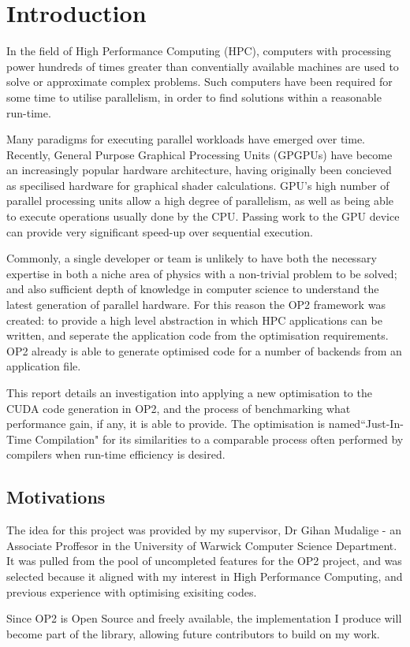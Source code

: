 
\section{Introduction}

In the field of High Performance Computing (HPC), computers with processing power hundreds of times greater than conventially available machines are used to solve or approximate complex problems. Such computers have been required for some time to utilise parallelism, in order to find solutions within a reasonable run-time.
\par Many paradigms for executing parallel workloads have emerged over time. Recently, General Purpose Graphical Processing Units (GPGPUs) have become an increasingly popular hardware architecture, having originally been concieved as specilised hardware for graphical shader calculations. GPU's high number of parallel processing units allow a high degree of parallelism, as well as being able to execute operations usually done by the CPU. Passing work to the GPU device can provide very significant speed-up over sequential execution.
\par
Commonly, a single developer or team is unlikely to have both the necessary expertise in both a niche area of physics with a non-trivial problem to be solved; and also sufficient depth of knowledge in computer science to understand the latest generation of parallel hardware. For this reason the OP2 framework was created: to provide a high level abstraction in which HPC applications can be written, and seperate the application code from the optimisation requirements. OP2 already is able to generate optimised code for a number of backends from an application file.
\par
This report details an investigation into applying a new optimisation to the CUDA code generation in OP2, and the process of benchmarking what performance gain, if any, it is able to provide.
The optimisation is named``Just-In-Time Compilation" for its similarities to a comparable process often performed by compilers when run-time efficiency is desired.
\vfill
\subsection{Motivations}
The idea for this project was provided by my supervisor, Dr Gihan Mudalige - an Associate Proffesor in the University of Warwick Computer Science Department. It was pulled from the pool of uncompleted features for the OP2 project, and was selected because it aligned with my interest in High Performance Computing, and previous experience with optimising exisiting codes.
\par
Since OP2 is Open Source and freely available, the implementation I produce will become part of the library, allowing future contributors to build on my work.

